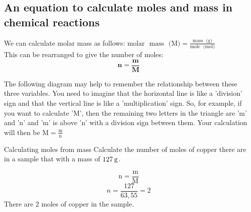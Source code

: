            \subsection*{An equation to calculate moles and mass in chemical reactions}
            \nopagebreak
      \label{m38717*id277432}We can calculate molar mass as follows:
$\text{molar ~mass ~(M)} = \frac{\text{mass ~(g)}}{\text{mole ~(mol)}}$ \\
This can be rearranged to give the number of moles:
      \label{m38717*id277436}\nopagebreak\noindent{}
    \begin{equation*}
    \mathbf{n} = \frac{\mathbf{m}}{\mathbf{M}}
      \end{equation*}
\label{m38717*notfhsst!!!underscore!!!id374}
	\par
      \label{m38717*id277605}The following diagram may help to remember the relationship between these three variables. You need to imagine that the horizontal line is like a 'division' sign and that the vertical line is like a 'multiplication' sign. So, for example, if you want to calculate 'M', then the remaining two letters in the triangle are 'm' and 'n' and 'm' is above 'n' with a division sign between them. Your calculation will then be $\text{M}=\frac{\text{m}}{\text{n}}$\par 
      \label{m38717*id277613}
    \setcounter{subfigure}{0}
	\begin{figure}[H] %
\begin{center}
\end{center}
 \end{figure}       
      \par 
\label{m38717*secfhsst!!!underscore!!!id409}
      \noindent
      \begin{wex}{Calculating moles from mass }{
\label{m38717*probfhsst!!!underscore!!!id410}
      \label{m38717*id277635}Calculate the number of moles of copper there are in a sample that with a mass of $127\phantom{\rule{2pt}{0ex}}\text{g}$. 
      }
{
      \label{m38717*id277680}\nopagebreak\noindent{}
        
    \begin{equation*}
    \text{n}=\frac{\text{m}}{\text{M}}
      \end{equation*}
      \label{m38717*id277705}\nopagebreak\noindent{}
    \begin{equation*}
    n=\frac{127}{63,55}=2
      \end{equation*}
      \label{m38717*id277735}There are 2 moles of copper in the sample.
}
    \end{wex}
    
